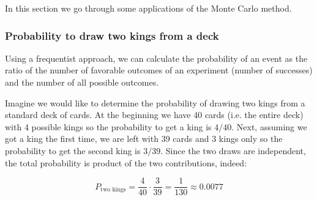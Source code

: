In this section we go through some applications of the Monte Carlo method.

\subsubsection{Probability to draw two kings from a deck}
Using a frequentist approach, we can calculate the
probability of an event as the ratio of the number of favorable outcomes
of an experiment (number of successes) and the number of all possible
outcomes. 

Imagine we would like to determine the probability of drawing two kings from a standard deck of cards.
At the beginning we have 40 cards (i.e. the entire deck) with 4 possible kings so the probability to get a king is $4/40$. Next, assuming we got a king the first time, we are left with 39 cards and 3 kings only so the probability to get the second king is $3/39$. Since the two draws are independent, the total probability is product of the two contributions, indeed:

\[P_\textrm{two kings} = \frac{4}{40} \cdot \frac{3}{39} = \frac{1}{130} \approx 0.0077\]

